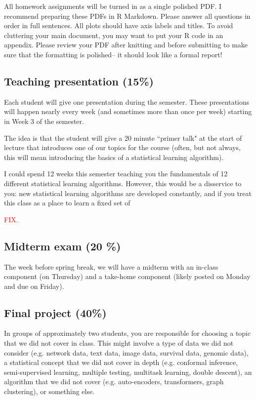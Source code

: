 \documentclass[11pt]{article}
\begin{document}
All homework assignments will be turned in as a single polished PDF. I recommend preparing these PDFs in R Markdown. Please answer all questions in order in full sentences. All plots should have axis labels and titles. To avoid cluttering your main document, you may want to put your R code in an appendix.  Please review your PDF after knitting and before submitting to make sure that the formatting is polished-- it should look like a formal report! 
  
\subsection{Teaching presentation (15\%)}

Each student will give one presentation during the semester. These presentations will happen nearly every week (and sometimes more than once per week) starting in Week 3 of the semester. 

The idea is that the student will give a 20 minute ``primer talk" at the start of lecture that introduces one of our topics for the course (often, but not always, this will mean introducing the basics of a statistical learning algorithm). 

I could spend 12 weeks this semester teaching you the fundamentals of 12 different statistical learning algorithms. However, this would be a disservice to you: new statistical learning algorithms are developed constantly, and if you treat this class as a place to learn a fixed set of 
 
 \textcolor{red}{FIX.} 

\subsection{Midterm exam (20 \%)}

The week before spring break, we will have a midterm with an in-class component (on Thursday) and a take-home component (likely posted on Monday and due on Friday). 


\subsection{Final project (40\%)}

In groups of approximately two students, you are responsible for choosing a topic that we did not cover in class. This might involve a type of data we did not consider (e.g. network data, text data, image data, survival data, genomic data), a statistical concept that we did not cover in depth (e.g. conformal inference, semi-supervised learning, multiple testing, multitask learning, double descent), an algorithm that we did not cover (e.g. auto-encoders, transformers, graph clustering), or something else. 
\end{document}

